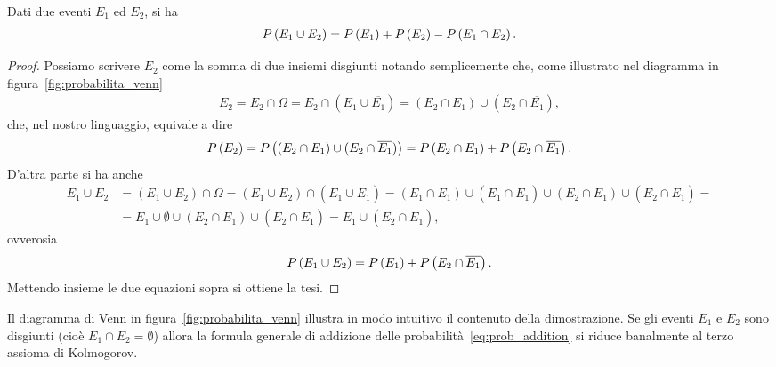 \begin{theorem}\label{theorem:prob_addition}
  Dati due eventi $E_1$ ed $E_2$, si ha
   \begin{align}\label{eq:prob_addition}
     \displaystyle P\left(E_1 \cup E_2\right) = \displaystyle P\left(E_1\right) + \displaystyle P\left(E_2\right) - \displaystyle P\left(E_1 \cap E_2\right).
  \end{align}
\end{theorem}
\begin{proof}
  Possiamo scrivere $E_2$ come la somma di due insiemi disgiunti
  notando semplicemente che, come illustrato nel diagramma in
  figura~\ref{fig:probabilita_venn}
  \begin{align*}
    E_2 = E_2 \cap \Omega = E_2 \cap (E_1 \cup \overline{E_1}) =
    (E_2 \cap E_1) \cup (E_2 \cap \overline{E_1}),
  \end{align*}
  che, nel nostro linguaggio, equivale a dire
  \begin{align*}
    \displaystyle P\left(E_2\right) = \displaystyle P\left((E_2 \cap E_1) \cup (E_2 \cap \overline{E_1})\right) =
    \displaystyle P\left(E_2 \cap E_1\right) + \displaystyle P\left(E_2 \cap \overline{E_1}\right).
  \end{align*}
  D'altra parte si ha anche
  \begin{align*}
    E_1 \cup E_2 & = (E_1 \cup E_2) \cap \Omega =
    (E_1 \cup E_2) \cap (E_1 \cup \overline{E_1}) =
    (E_1 \cap E_1) \cup (E_1 \cap \overline{E_1}) \cup
    (E_2 \cap E_1) \cup (E_2 \cap \overline{E_1}) =\\
    & = E_1 \cup \emptyset \cup (E_2 \cap E_1) \cup (E_2 \cap \overline{E_1}) =
    E_1 \cup (E_2 \cap \overline{E_1}),
  \end{align*}
  ovverosia
  \begin{align*}
    \displaystyle P\left(E_1 \cup E_2\right) = \displaystyle P\left(E_1\right) + \displaystyle P\left(E_2 \cap \overline{E_1}\right).
  \end{align*}
  Mettendo insieme le due equazioni sopra si ottiene la tesi.
\end{proof}



Il diagramma di Venn in figura~\ref{fig:probabilita_venn} illustra in modo
intuitivo il contenuto della dimostrazione. Se gli eventi $E_1$ e $E_2$ sono
disgiunti (cioè $E_1 \cap E_2 = \emptyset$) allora la formula generale di
addizione delle probabilità~\eqref{eq:prob_addition} si riduce banalmente al
terzo assioma di Kolmogorov.


